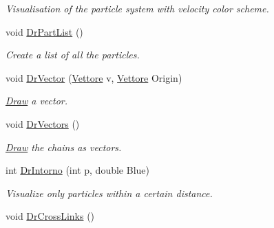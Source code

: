 \begin{DoxyCompactItemize}
\begin{DoxyCompactList}\small\item\em Visualisation of the particle system with velocity color scheme. \end{DoxyCompactList}\item 
void \hyperlink{classElPoly_ae89cedb0e996d10ec5f96e14f1f867cf}{Dr\+Part\+List} ()\hypertarget{classElPoly_ae89cedb0e996d10ec5f96e14f1f867cf}{}\label{classElPoly_ae89cedb0e996d10ec5f96e14f1f867cf}

\begin{DoxyCompactList}\small\item\em Create a list of all the particles. \end{DoxyCompactList}\item 
void \hyperlink{classElPoly_a3eef417e007c18f604455cfb38a948cb}{Dr\+Vector} (\hyperlink{classVettore}{Vettore} v, \hyperlink{classVettore}{Vettore} Origin)\hypertarget{classElPoly_a3eef417e007c18f604455cfb38a948cb}{}\label{classElPoly_a3eef417e007c18f604455cfb38a948cb}

\begin{DoxyCompactList}\small\item\em \hyperlink{classDraw}{Draw} a vector. \end{DoxyCompactList}\item 
void \hyperlink{classElPoly_a9968be2f08ada4e898c92c7e8552ac63}{Dr\+Vectors} ()\hypertarget{classElPoly_a9968be2f08ada4e898c92c7e8552ac63}{}\label{classElPoly_a9968be2f08ada4e898c92c7e8552ac63}

\begin{DoxyCompactList}\small\item\em \hyperlink{classDraw}{Draw} the chains as vectors. \end{DoxyCompactList}\item 
int \hyperlink{classElPoly_a21b11a8a49dc2686cd23c41f24a3ec86}{Dr\+Intorno} (int p, double Blue)\hypertarget{classElPoly_a21b11a8a49dc2686cd23c41f24a3ec86}{}\label{classElPoly_a21b11a8a49dc2686cd23c41f24a3ec86}

\begin{DoxyCompactList}\small\item\em Visualize only particles within a certain distance. \end{DoxyCompactList}\item 
void \hyperlink{classElPoly_ad36be1f2ea9bef2742992bfb62023fb8}{Dr\+Cross\+Links} ()\hypertarget{classElPoly_ad36be1f2ea9bef2742992bfb62023fb8}{}\label{classElPoly_ad36be1f2ea9bef2742992bfb62023fb8}


\end{DoxyCompactItemize}

